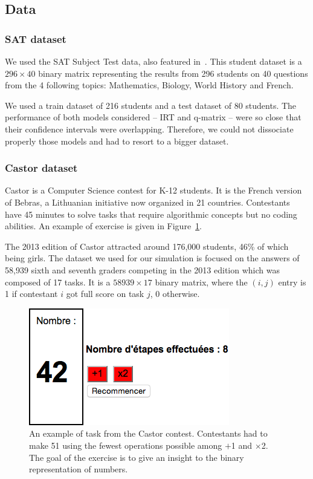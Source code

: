\documentclass{sig-alternate}
\begin{document}
\subsection{Data} %

\subsubsection{SAT dataset}

We used the SAT Subject Test data, also featured in~\cite{Winters2005, Desmarais2011}. This student dataset is a $296 \times 40$ binary matrix representing the results from 296 students on 40 questions from the 4 following topics: Mathematics, Biology, World History and French.

We used a train dataset of 216 students and a test dataset of 80 students. The performance of both models considered -- IRT and q-matrix -- were so close that their confidence intervals were overlapping. Therefore, we could not dissociate properly those models and had to resort to a bigger dataset.

\subsubsection{Castor dataset}

Castor is a Computer Science contest for K-12 students. It is the French version of Bebras, a Lithuanian initiative now organized in 21 countries. Contestants have 45 minutes to solve tasks that require algorithmic concepts but no coding abilities. An example of exercise is given in Figure~\ref{fig:51}.

The 2013 edition of Castor attracted around 176,000 students, 46\% of which being girls. The dataset we used for our simulation is focused on the answers of 58,939 sixth and seventh graders competing in the 2013 edition which was composed of 17 tasks. It is a $58939 \times 17$ binary matrix, where the $(i, j)$ entry is 1 if contestant $i$ got full score on task $j$, 0 otherwise.

\begin{figure}
\includegraphics[width=\linewidth]{51-calc}
\caption{An example of task from the Castor contest. Contestants had to make 51 using the fewest operations possible among $+$1 and $\times$2. The goal of the exercise is to give an insight to the binary representation of numbers.}
\label{fig:51}
\end{figure}
\end{document}
